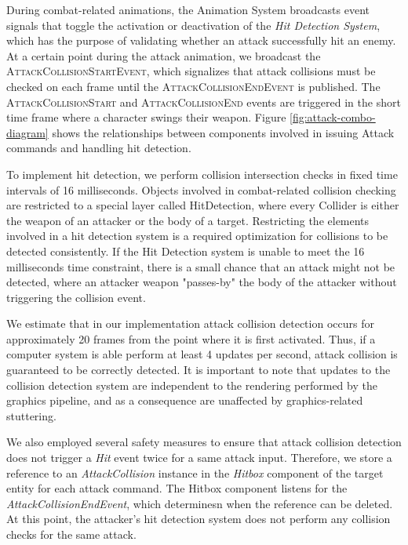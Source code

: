 During combat-related animations, the Animation System broadcasts event signals that toggle the activation or deactivation of the \emph{Hit Detection System}, which has the purpose of validating whether an attack successfully hit an enemy. At a certain point during the attack animation, we broadcast the \textsc{AttackCollisionStartEvent}, which signalizes that attack collisions must be checked on each frame until the \textsc{AttackCollisionEndEvent} is published. The \textsc{AttackCollisionStart} and \textsc{AttackCollisionEnd} events are triggered in the short time frame where a character swings their weapon. Figure \ref{fig:attack-combo-diagram} shows the relationships between components involved in issuing Attack commands and handling hit detection.



To implement hit detection, we perform collision intersection checks in fixed time intervals of 16 milliseconds. Objects involved in combat-related collision checking are restricted to a special layer called HitDetection, where every Collider is either the weapon of an attacker or the body of a target. Restricting the elements involved in a hit detection system is a required optimization for collisions to be detected consistently. If the Hit Detection system is unable to meet the 16 milliseconds time constraint, there is a small chance that an attack might not be detected, where an attacker weapon "passes-by" the body of the attacker without triggering the collision event.

We estimate that in our implementation attack collision detection occurs for approximately 20 frames from the point where it is first activated. Thus, if a computer system is able perform at least 4 updates per second, attack collision is guaranteed to be correctly detected. It is important to note that updates to the collision detection system are independent to the rendering performed by the graphics pipeline, and as a consequence are unaffected by graphics-related stuttering.

We also employed several safety measures to ensure that attack collision detection does not trigger a \emph{Hit} event twice for a same attack input. Therefore, we store a reference to an \emph{AttackCollision} instance in the \emph{Hitbox} component of the target entity for each attack command. The Hitbox component listens for the \emph{AttackCollisionEndEvent}, which determinesn when the reference can be deleted. At this point, the attacker's hit detection system does not perform any collision checks for the same attack.

